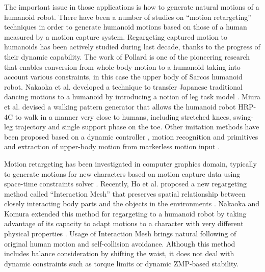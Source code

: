 \documentclass[letterpaper, 10 pt, conference]{ieeeconf}  %
\begin{document}
The important issue in those applications is how to generate natural
motions of a humanoid robot. 
There have been a number of studies on ``motion retargeting''
techniques in order to
generate humanoid motions based on those of a human measured by a
motion capture system.
Regargeting captured motion to humanoids has been
actively studied during last decade, thanks to the progress of their
dynamic capability. The work of Pollard \cite{Pollard02ICRA} is one of
the pioneering research that enables conversion from whole-body motion
to a humanoid taking into account various constraints, in this case
the upper body of Sarcos humanoid robot.
Nakaoka et al. developed a technique to  transfer
Japanese traditional dancing motions  to a humanoid by introducing a
notion of leg task model \cite{nakaoka_icra2004,nakaoka_2007}.
Miura et al. \cite{Miura11IROS} devised a walking pattern generator
that allows the humanoid robot HRP-4C to walk in a manner very close
to humans, including stretched knees, swing-leg trajectory and single
support phase on the toe.
Other imitation methods have been proposed based on a dynamic
controller  \cite{Yamane11humanoids,Ramos11humanoids}, 
motion recognition and primitives \cite{Ott08humanoids} and
extraction of upper-body motion from markerless motion input
\cite{Dariush08IROS,Do08humanoids}. 



% 


Motion retargeting has been investigated in computer
graphics domain, typically to generate motions for new characters
based on motion capture data using space-time constraints solver
\cite{Gleicher98}.  
Recently, Ho et al. proposed a new regargeting method called
``Interaction Mesh'' 
that preserves spatial relationship between closely interacting body
parts and the objects in the environments \cite{Komura10}.
Nakaoka and Komura extended this method for regargeting to a humanoid
robot by taking advantage of its capacity to adapt motions
to a character with very different physical properties
\cite{Nakaoka12Humanoids}. Usage of Interaction Mesh brings natural
following of original human motion and self-collision avoidance.
Although this method includes
balance consideration by shifting the waist,  it does not deal with 
dynamic constraints such as torque limits or dynamic ZMP-based stability.
\end{document}
